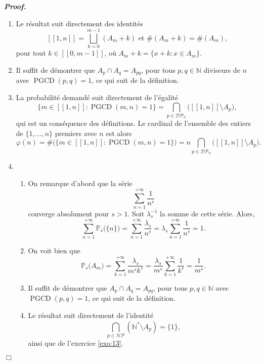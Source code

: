 \documentclass[11pt,a4paper]{article}
\newcommand{\NN}{\mathbb{N}}
\newenvironment{preuve}[1][]
{\vskip 2mm  \noindent\emph{\bf Proof#1. }}{$\Box$ \vskip 2mm}
\newcounter{exercice}
\begin{document}
		\begin{preuve}
			\begin{enumerate}
				\item Le résultat suit directement des identités  
				\[     [\![ 1 , n ]\!] = \bigsqcup_{k=0}^{m-1} (A_{m} + k) \text{ et } \#(A_{m}+ k) = \#(A_{m}),     \]
				pour tout $k \in [\![ 0 , m-1 ]\!]$, où $A_{m} + k = \{ x + k : x \in A_{m} \}$. 
				
				\item Il suffit de démontrer que $A_{p} \cap A_{q} = A_{p q}$, pour tous $p, q \in \NN$ diviseurs de $n$ avec $\operatorname{PGCD}(p,q)=1$, ce qui suit de la définition. 
				
				\item La probabilité demandé suit directement de l'égalité  
				\[     \{ m \in [\![ 1 , n ]\!] : \operatorname{PGCD}(m,n)=1 \}  = \bigcap_{p \in \mathscr{DP}_{n}} \big([\![ 1 , n ]\!] \setminus A_{p}\big),     \]
				qui est un conséquence des définitions. 
				Le cardinal de l'ensemble des entiers de $\{1,\dots,n\}$ premiers avec $n$ est alors 
				\[     \varphi(n) = \#\big(\{ m \in [\![ 1 , n ]\!] : \operatorname{PGCD}(m,n)=1 \}\big) = n \bigcap_{p \in \mathscr{DP}_{n}} \big([\![ 1 , n ]\!] \setminus A_{p}\big).     \]
				
				\item 
				\begin{enumerate}[label=(\roman*)]
					\item On remarque d'abord que la série 
					\[     \sum_{n = 1}^{+ \infty} \frac{1}{n^{s}}   \]
					converge absolument pour $s > 1$. 
					Soit $\lambda_{s}^{-1}$ la somme de cette série.  
					Alors, 
					\[     \sum_{n = 1}^{+ \infty} \mathbb{P}_s\big(\{n\}\big) = \sum_{n = 1}^{+ \infty} \frac{\lambda_{s}}{n^{s}} = \lambda_{s} \sum_{n = 1}^{+ \infty} \frac{1}{n^{s}} = 1.   \]
					
					\item On voit bien que 
					\[     \mathbb{P}_s\big(A_{m}\big) = \sum_{k = 1}^{+ \infty} \frac{\lambda_{s}}{m^{s} k^{s}} = \frac{\lambda_{s}}{m^{s}} \sum_{k = 1}^{+ \infty} \frac{1}{k^{s}} = \frac{1}{m^{s}}.   \]
					
					\item Il suffit de démontrer que $A_{p} \cap A_{q} = A_{p q}$, pour tous $p, q \in \NN$ avec $\operatorname{PGCD}(p,q)=1$, ce qui suit de la définition. 
					
					\item Le résultat suit directement de l'identité 
					\[     \bigcap_{p \in \mathscr{NP}} (\NN^{*} \setminus A_{p}) = \{ 1 \},     \]
					ainsi que de l'exercice \ref{exo:13}. 
					

\end{enumerate}
\end{enumerate}
\end{preuve}
\end{document}
